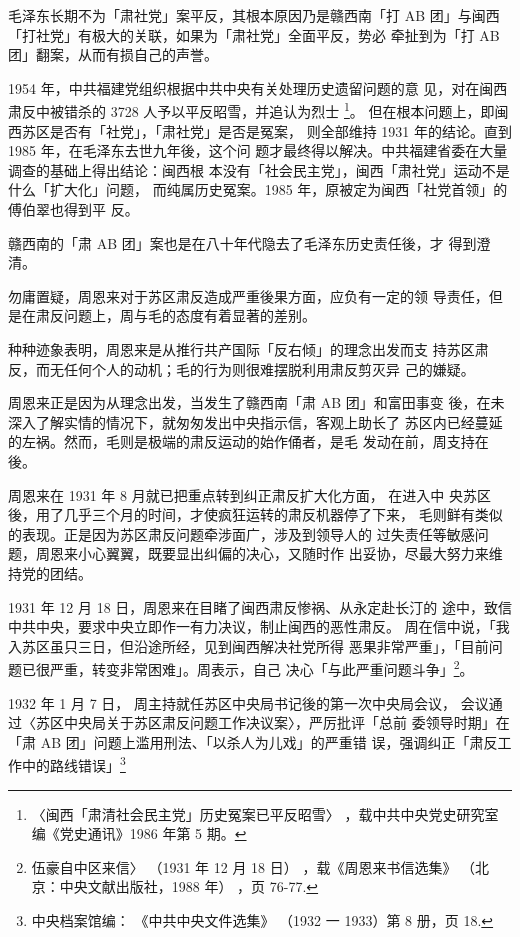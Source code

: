 毛泽东长期不为「肃社党」案平反，其根本原因乃是赣西南「打 AB
团」与闽西「打社党」有极大的关联，如果为「肃社党」全面平反，势必
牵扯到为「打 AB 团」翻案，从而有损自己的声誉。

1954 年，中共福建党组织根据中共中央有关处理历史遗留问题的意
见，对在闽西肃反中被错杀的 3728 人予以平反昭雪，并追认为烈士
\footnote{〈闽西「肃清社会民主党」历史冤案已平反昭雪〉
，载中共中央党史研究室编《党史通讯》1986 年第 5 期。}。
但在根本问题上，即闽西苏区是否有「社党」，「肃社党」是否是冤案，
则全部维持 1931 年的结论。直到 1985 年，在毛泽东去世九年後，这个问
题才最终得以解决。中共福建省委在大量调查的基础上得出结论：闽西根
本没有「社会民主党」，闽西「肃社党」运动不是什么「扩大化」问题，
而纯属历史冤案。1985 年，原被定为闽西「社党首领」的傅伯翠也得到平
反。

赣西南的「肃 AB 团」案也是在八十年代隐去了毛泽东历史责任後，才
得到澄清。

勿庸置疑，周恩来对于苏区肃反造成严重後果方面，应负有一定的领
导责任，但是在肃反问题上，周与毛的态度有着显著的差别。

种种迹象表明，周恩来是从推行共产国际「反右倾」的理念出发而支
持苏区肃反，而无任何个人的动机；毛的行为则很难摆脱利用肃反剪灭异
己的嫌疑。

周恩来正是因为从理念出发，当发生了赣西南「肃 AB 团」和富田事变
後，在未深入了解实情的情况下，就匆匆发出中央指示信，客观上助长了
苏区内已经蔓延的左祸。然而，毛则是极端的肃反运动的始作俑者，是毛
发动在前，周支持在後。

周恩来在 1931 年 8 月就已把重点转到纠正肃反扩大化方面，
在进入中
央苏区後，用了几乎三个月的时间，才使疯狂运转的肃反机器停了下来，
毛则鲜有类似的表现。正是因为苏区肃反问题牵涉面广，涉及到领导人的
过失责任等敏感问题，周恩来小心翼翼，既要显出纠偏的决心，又随时作
出妥协，尽最大努力来维持党的团结。

1931 年 12 月 18 日，周恩来在目睹了闽西肃反惨祸、从永定赴长汀的
途中，致信中共中央，要求中央立即作一有力决议，制止闽西的恶性肃反。
周在信中说，「我入苏区虽只三日，但沿途所经，见到闽西解决社党所得
恶果非常严重」，「目前问题已很严重，转变非常困难」。周表示，自己
决心「与此严重问题斗争」\footnote{伍豪自中区来信〉
（1931 年 12 月 18 日）
，载《周恩来书信选集》
（北京：中央文献出版社，1988 年）
，页 76-77.}。

1932 年 1 月 7 日，
周主持就任苏区中央局书记後的第一次中央局会议，
会议通过〈苏区中央局关于苏区肃反问题工作决议案〉，严厉批评「总前
委领导时期」在「肃 AB 团」问题上滥用刑法、「以杀人为儿戏」的严重错
误，强调纠正「肃反工作中的路线错误」\footnote{ 中央档案馆编：
《中共中央文件选集》
（1932 一 1933）第 8 册，页 18.} 

